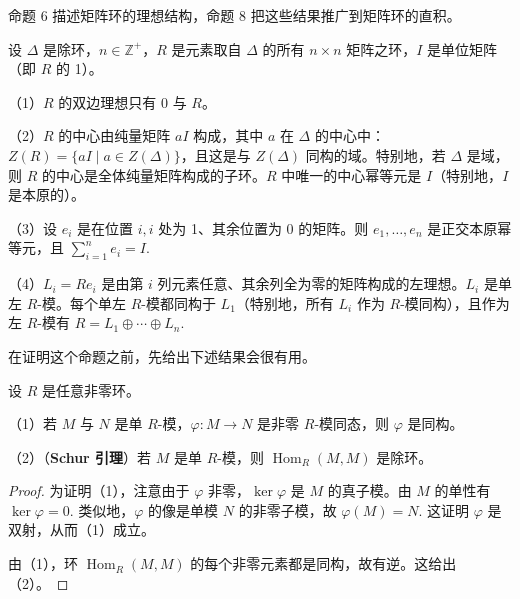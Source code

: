 命题 6 描述矩阵环的理想结构，命题 8 把这些结果推广到矩阵环的直积。

\begin{proposition}\label{pro:18.6}
设 \(\Delta\) 是除环，\(n \in \mathbb{Z}^+\)，\(R\) 是元素取自 \(\Delta\) 的所有 \(n \times n\) 矩阵之环，\(I\) 是单位矩阵（即 \(R\) 的 1）。

（1）\(R\) 的双边理想只有 0 与 \(R\)。

（2）\(R\) 的中心由纯量矩阵 \(aI\) 构成，其中 \(a\) 在 \(\Delta\) 的中心中：\(Z(R) = \{aI \mid a \in Z(\Delta)\}\)，且这是与 \(Z(\Delta)\) 同构的域。特别地，若 \(\Delta\) 是域，则 \(R\) 的中心是全体纯量矩阵构成的子环。\(R\) 中唯一的中心幂等元是 \(I\)（特别地，\(I\) 是本原的）。

（3）设 \(e_i\) 是在位置 \(i,i\) 处为 1、其余位置为 0 的矩阵。则 \(e_1, \ldots, e_n\) 是正交本原幂等元，且 \(\sum_{i=1}^{n}e_i = I\).

（4）\(L_i = Re_i\) 是由第 \(i\) 列元素任意、其余列全为零的矩阵构成的左理想。\(L_i\) 是单左 \(R\)-模。每个单左 \(R\)-模都同构于 \(L_1\)（特别地，所有 \(L_i\) 作为 \(R\)-模同构），且作为左 \(R\)-模有 \(R = L_1 \oplus \cdots \oplus L_n\).
\end{proposition}

在证明这个命题之前，先给出下述结果会很有用。

\begin{lemma}\label{lem:18.7}
设 \(R\) 是任意非零环。

（1）若 \(M\) 与 \(N\) 是单 \(R\)-模，\(\varphi : M \to N\) 是非零 \(R\)-模同态，则 \(\varphi\) 是同构。

（2）（\textbf{Schur 引理}）若 \(M\) 是单 \(R\)-模，则 \(\operatorname{Hom}_R(M, M)\) 是除环。
\end{lemma}

\begin{proof}
为证明（1），注意由于 \(\varphi\) 非零，\(\ker\varphi\) 是 \(M\) 的真子模。由 \(M\) 的单性有 \(\ker\varphi = 0\). 类似地，\(\varphi\) 的像是单模 \(N\) 的非零子模，故 \(\varphi(M) = N\). 这证明 \(\varphi\) 是双射，从而（1）成立。

由（1），环 \(\operatorname{Hom}_R(M, M)\) 的每个非零元素都是同构，故有逆。这给出（2）。
\end{proof}

